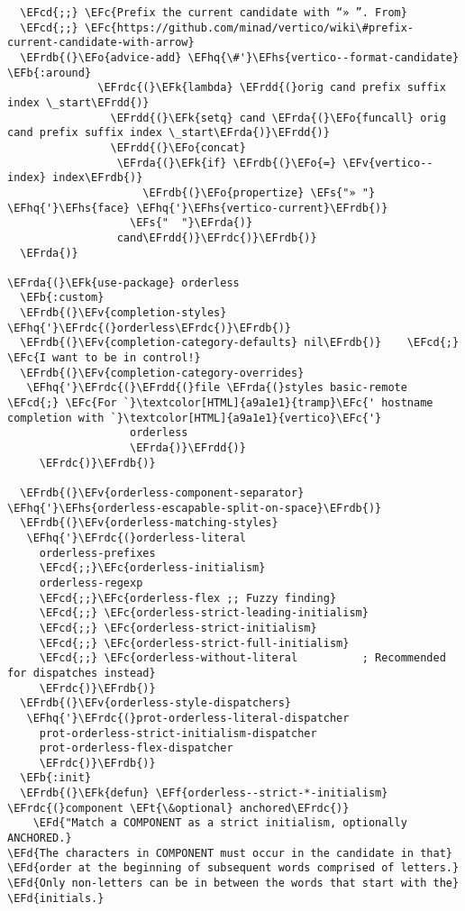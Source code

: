 \documentclass[a4wide,10pt]{article}
\newcommand{\EFc}[1]{\textcolor{EFc}{#1}} %
\newcommand{\EFcd}[1]{\textcolor{EFcd}{#1}} %
\newcommand{\EFs}[1]{\textcolor{EFs}{#1}} %
\newcommand{\EFd}[1]{\textcolor{EFd}{#1}} %
\newcommand{\EFk}[1]{\textcolor{EFk}{#1}} %
\newcommand{\EFb}[1]{\textcolor{EFb}{#1}} %
\newcommand{\EFf}[1]{\textcolor{EFf}{#1}} %
\newcommand{\EFv}[1]{\textcolor{EFv}{#1}} %
\newcommand{\EFt}[1]{\textcolor{EFt}{#1}} %
\newcommand{\EFo}[1]{\textcolor{EFo}{#1}} %
\newcommand{\EFhq}[1]{\textcolor{EFhq}{#1}} %
\newcommand{\EFhs}[1]{\textcolor{EFhs}{#1}} %
\newcommand{\EFrda}[1]{\textcolor{EFrda}{#1}} %
\newcommand{\EFrdb}[1]{\textcolor{EFrdb}{#1}} %
\newcommand{\EFrdc}[1]{\textcolor{EFrdc}{#1}} %
\newcommand{\EFrdd}[1]{\textcolor{EFrdd}{#1}} %
\begin{document}
\begin{Code}
\begin{Verbatim}
  \EFcd{;;} \EFc{Prefix the current candidate with “» ”. From}
  \EFcd{;;} \EFc{https://github.com/minad/vertico/wiki\#prefix-current-candidate-with-arrow}
  \EFrdb{(}\EFo{advice-add} \EFhq{\#'}\EFhs{vertico--format-candidate} \EFb{:around}
              \EFrdc{(}\EFk{lambda} \EFrdd{(}orig cand prefix suffix index \_start\EFrdd{)}
                \EFrdd{(}\EFk{setq} cand \EFrda{(}\EFo{funcall} orig cand prefix suffix index \_start\EFrda{)}\EFrdd{)}
                \EFrdd{(}\EFo{concat}
                 \EFrda{(}\EFk{if} \EFrdb{(}\EFo{=} \EFv{vertico--index} index\EFrdb{)}
                     \EFrdb{(}\EFo{propertize} \EFs{"» "} \EFhq{'}\EFhs{face} \EFhq{'}\EFhs{vertico-current}\EFrdb{)}
                   \EFs{"  "}\EFrda{)}
                 cand\EFrdd{)}\EFrdc{)}\EFrdb{)}
  \EFrda{)}

\EFrda{(}\EFk{use-package} orderless
  \EFb{:custom}
  \EFrdb{(}\EFv{completion-styles} \EFhq{'}\EFrdc{(}orderless\EFrdc{)}\EFrdb{)}
  \EFrdb{(}\EFv{completion-category-defaults} nil\EFrdb{)}    \EFcd{;} \EFc{I want to be in control!}
  \EFrdb{(}\EFv{completion-category-overrides}
   \EFhq{'}\EFrdc{(}\EFrdd{(}file \EFrda{(}styles basic-remote \EFcd{;} \EFc{For `}\textcolor[HTML]{a9a1e1}{tramp}\EFc{' hostname completion with `}\textcolor[HTML]{a9a1e1}{vertico}\EFc{'}
                   orderless
                   \EFrda{)}\EFrdd{)}
     \EFrdc{)}\EFrdb{)}

  \EFrdb{(}\EFv{orderless-component-separator} \EFhq{'}\EFhs{orderless-escapable-split-on-space}\EFrdb{)}
  \EFrdb{(}\EFv{orderless-matching-styles}
   \EFhq{'}\EFrdc{(}orderless-literal
     orderless-prefixes
     \EFcd{;;}\EFc{orderless-initialism}
     orderless-regexp
     \EFcd{;;}\EFc{orderless-flex ;; Fuzzy finding}
     \EFcd{;;} \EFc{orderless-strict-leading-initialism}
     \EFcd{;;} \EFc{orderless-strict-initialism}
     \EFcd{;;} \EFc{orderless-strict-full-initialism}
     \EFcd{;;} \EFc{orderless-without-literal          ; Recommended for dispatches instead}
     \EFrdc{)}\EFrdb{)}
  \EFrdb{(}\EFv{orderless-style-dispatchers}
   \EFhq{'}\EFrdc{(}prot-orderless-literal-dispatcher
     prot-orderless-strict-initialism-dispatcher
     prot-orderless-flex-dispatcher
     \EFrdc{)}\EFrdb{)}
  \EFb{:init}
  \EFrdb{(}\EFk{defun} \EFf{orderless--strict-*-initialism} \EFrdc{(}component \EFt{\&optional} anchored\EFrdc{)}
    \EFd{"Match a COMPONENT as a strict initialism, optionally ANCHORED.}
\EFd{The characters in COMPONENT must occur in the candidate in that}
\EFd{order at the beginning of subsequent words comprised of letters.}
\EFd{Only non-letters can be in between the words that start with the}
\EFd{initials.}


\end{Verbatim}
\end{Code}
\end{document}
